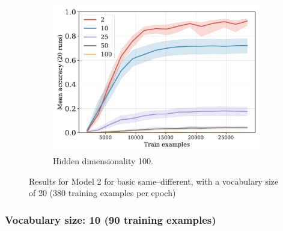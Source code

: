 \documentclass[12pt]{article}
\begin{document}
\begin{figure}[H]
  \begin{subfigure}{0.45\linewidth}
    \includegraphics[width=1\textwidth]{fig/fuzzy-lm-vocab20-train_size-embed_dim-hidden_dim=100.pdf}
    \caption{Hidden dimensionality 100.}
  \end{subfigure}
  \caption{Results for Model 2 for basic same--different, with a vocabulary size of 20 (380 training examples per epoch)}
  \label{fig:model2:vocab20}
\end{figure}



\subsubsection{Vocabulary size: 10 (90 training examples)}
\end{document}
